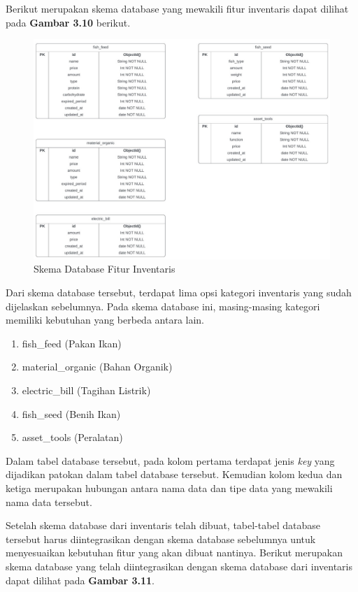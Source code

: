 \begin{spacing}{1.5}
	Berikut merupakan skema database yang mewakili fitur inventaris dapat dilihat pada \textbf{Gambar 3.10} berikut.
	
	\begin{figure}[H]
		\centering
		\includegraphics[width=1\textwidth]{gambar/sprint1/sprint1_inventaris_database.jpeg}
		\caption{Skema Database Fitur Inventaris}
	\end{figure}

	Dari skema database tersebut, terdapat lima opsi kategori inventaris yang sudah dijelaskan sebelumnya. Pada skema database ini, masing-masing kategori memiliki kebutuhan yang berbeda antara lain.

	\begin{enumerate}
		\item fish\_feed (Pakan Ikan)
		\item material\_organic (Bahan Organik)
		\item electric\_bill (Tagihan Listrik)
		\item fish\_seed (Benih Ikan)
		\item asset\_tools (Peralatan)
	\end{enumerate}

	Dalam tabel database tersebut, pada kolom pertama terdapat jenis \textit{key} yang dijadikan patokan dalam tabel database tersebut. Kemudian kolom kedua dan ketiga merupakan hubungan antara nama data dan tipe data yang mewakili nama data tersebut.

	Setelah skema database dari inventaris telah dibuat, tabel-tabel database tersebut harus diintegrasikan dengan skema database sebelumnya untuk menyesuaikan kebutuhan fitur yang akan dibuat nantinya. Berikut merupakan skema database yang telah diintegrasikan dengan skema database dari inventaris dapat dilihat pada \textbf{Gambar 3.11}.


\end{spacing}
